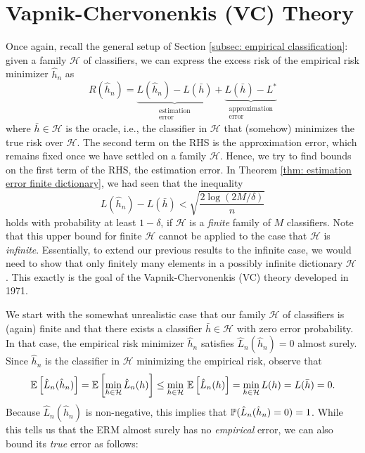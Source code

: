 \chapter{Vapnik-Chervonenkis (VC) Theory}
\label{ch: VC theory}

Once again, recall the general setup of Section \ref{subsec: empirical classification}: given a family $\mathcal{H}$ of classifiers, we can express the excess risk of the empirical risk minimizer $\hat h_n$ as
\[
    R(\hat h_n) = \underbrace{L(\hat h_n) - L(\bar h)}_{\substack{\text{estimation} \\ \text{error}}} + \underbrace{L(\bar h) - L^*}_{\substack{\text{approximation} \\ \text{error}}}
\]
where $\bar h \in \mathcal{H}$ is the oracle, i.e., the classifier in $\mathcal{H}$ that (somehow) minimizes the true risk over $\mathcal{H}$. The second term on the RHS is the approximation error, which remains fixed once we have settled on a family $\mathcal{H}$. Hence, we try to find bounds on the first term of the RHS, the estimation error. In Theorem \ref{thm: estimation error finite dictionary}, we had seen that the inequality
\[
    L(\hat h_n) - L(\bar h) < \sqrt{\frac{2 \log(2M / \delta)}{n}}
\]
holds with probability at least $1 - \delta$, if $\mathcal{H}$ is a \emph{finite} family of $M$ classifiers. Note that this upper bound for finite $\mathcal{H}$ cannot be applied to the case that $\mathcal{H}$ is \emph{infinite}. Essentially, to extend our previous results to the infinite case, we would need to show that only finitely many elements in a possibly infinite dictionary $\mathcal{H}$ . This exactly is the goal of the Vapnik-Chervonenkis (VC) theory developed in 1971.

We start with the somewhat unrealistic case that our family $\mathcal{H}$ of classifiers is (again) finite and that there exists a classifier $\bar h \in \mathcal{H}$ with zero error probability. In that case, the empirical risk minimizer $\hat h_n$ satisfies $\hat L_n(\hat h_n) = 0$ almost surely. Since $\hat h_n$ is the classifier in $\mathcal{H}$ minimizing the empirical risk, observe that
\[
    \Ex{\hat L_n(\hat h_n)} = \Ex{\min_{h \in \mathcal{H}} \hat L_n(h)} \leq \min_{h \in \mathcal{H}} \, \Ex{\hat L_n(h)} = \min_{h \in \mathcal{H}} L(h) = L(\bar h) = 0.
\]
Because $\hat L_n(\hat h_n)$ is non-negative, this implies that $\P(\hat L_n(\hat h_n) = 0) = 1$. While this tells us that the ERM almost surely has no \emph{empirical} error, we can also bound its \emph{true} error as follows:


